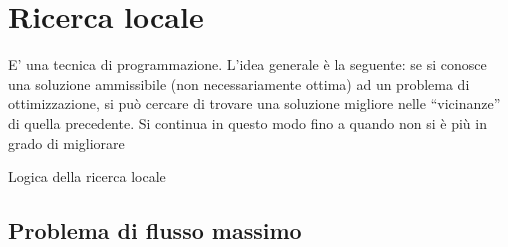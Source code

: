 
\ifsubfile
\usepackage[newfloat, cachedir=_minted-cache, outputdir=../build]{minted}
\usepackage{../libraries/set-minted}

\pagestyle{plain}
\setcounter{chapter}{14}


\fi
\chapter{Ricerca locale}

E' una tecnica di programmazione. L'idea generale è la seguente: se si conosce una soluzione ammissibile (non necessariamente ottima) ad un problema di ottimizzazione, si può cercare di trovare una soluzione migliore nelle \enquote{vicinanze} di quella precedente.
Si continua in questo modo fino a quando non si è più in grado di migliorare

\begin{minipage}{.6\linewidth}
	\begin{algorithm*}[H]
	\caption{Logica della ricerca locale}


\end{algorithm*}
\end{minipage}
\begin{minipage}{.4\linewidth}
\centering
	\pgfplotsset{width=5cm}
\end{minipage}

\section{Problema di flusso massimo}

